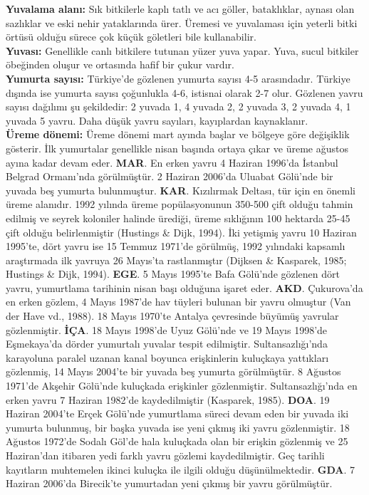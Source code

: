 \documentclass[
  a4paper,
  DIV=11,
  numbers=noendperiod]{scrreprt}
\begin{document}
\textbf{Yuvalama alanı:} Sık bitkilerle kaplı tatlı ve acı göller,
bataklıklar, aynası olan sazlıklar ve eski nehir yataklarında ürer.
Üremesi ve yuvalaması için yeterli bitki örtüsü olduğu sürece çok küçük
göletleri bile kullanabilir.\\
\textbf{Yuvası:} Genellikle canlı bitkilere tutunan yüzer yuva yapar.
Yuva, sucul bitkiler öbeğinden oluşur ve ortasında hafif bir çukur
vardır.\\
\textbf{Yumurta sayısı:} Türkiye'de gözlenen yumurta sayısı 4-5
arasındadır. Türkiye dışında ise yumurta sayısı çoğunlukla 4-6, istisnai
olarak 2-7 olur. Gözlenen yavru sayısı dağılımı şu şekildedir: 2 yuvada
1, 4 yuvada 2, 2 yuvada 3, 2 yuvada 4, 1 yuvada 5 yavru. Daha düşük
yavru sayıları, kayıplardan kaynaklanır.\\
\textbf{Üreme dönemi:} Üreme dönemi mart ayında başlar ve bölgeye göre
değişiklik gösterir. İlk yumurtalar genellikle nisan başında ortaya
çıkar ve üreme ağustos ayına kadar devam eder. \textbf{MAR}. En erken
yavru 4 Haziran 1996'da İstanbul Belgrad Ormanı'nda görülmüştür. 2
Haziran 2006'da Uluabat Gölü'nde bir yuvada beş yumurta bulunmuştur.
\textbf{KAR}. Kızılırmak Deltası, tür için en önemli üreme alanıdır.
1992 yılında üreme popülasyonunun 350-500 çift olduğu tahmin edilmiş ve
seyrek koloniler halinde ürediği, üreme sıklığının 100 hektarda 25-45
çift olduğu belirlenmiştir (Hustings \& Dijk, 1994). İki yetişmiş yavru
10 Haziran 1995'te, dört yavru ise 15 Temmuz 1971'de görülmüş, 1992
yılındaki kapsamlı araştırmada ilk yavruya 26 Mayıs'ta rastlanmıştır
(Dijksen \& Kasparek, 1985; Hustings \& Dijk, 1994). \textbf{EGE}. 5
Mayıs 1995'te Bafa Gölü'nde gözlenen dört yavru, yumurtlama tarihinin
nisan başı olduğuna işaret eder. \textbf{AKD}. Çukurova'da en erken
gözlem, 4 Mayıs 1987'de hav tüyleri bulunan bir yavru olmuştur (Van der
Have vd., 1988). 18 Mayıs 1970'te Antalya çevresinde büyümüş yavrular
gözlenmiştir. \textbf{İÇA}. 18 Mayıs 1998'de Uyuz Gölü'nde ve 19 Mayıs
1998'de Eşmekaya'da dörder yumurtalı yuvalar tespit edilmiştir.
Sultansazlığı'nda karayoluna paralel uzanan kanal boyunca erişkinlerin
kuluçkaya yattıkları gözlenmiş, 14 Mayıs 2004'te bir yuvada beş yumurta
görülmüştür. 8 Ağustos 1971'de Akşehir Gölü'nde kuluçkada erişkinler
gözlenmiştir. Sultansazlığı'nda en erken yavru 7 Haziran 1982'de
kaydedilmiştir (Kasparek, 1985). \textbf{DOA}. 19 Haziran 2004'te Erçek
Gölü'nde yumurtlama süreci devam eden bir yuvada iki yumurta bulunmuş,
bir başka yuvada ise yeni çıkmış iki yavru gözlenmiştir. 18 Ağustos
1972'de Sodalı Göl'de hala kuluçkada olan bir erişkin gözlenmiş ve 25
Haziran'dan itibaren yedi farklı yavru gözlemi kaydedilmiştir. Geç
tarihli kayıtların muhtemelen ikinci kuluçka ile ilgili olduğu
düşünülmektedir. \textbf{GDA}. 7 Haziran 2006'da Birecik'te yumurtadan
yeni çıkmış bir yavru görülmüştür.
\end{document}
